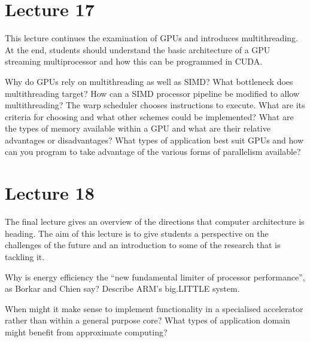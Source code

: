 \documentclass{supervision}
\begin{document}
\section*{Lecture 17}

This lecture continues the examination of GPUs and introduces multithreading. At the end, students should understand the basic architecture of a GPU streaming multiprocessor and how this can be programmed in CUDA.

\begin{questions}
    \question
    Why do GPUs rely on multithreading as well as SIMD? What bottleneck does multithreading target?
    \question
    How can a SIMD processor pipeline be modified to allow multithreading?
    \question
    The warp scheduler chooses instructions to execute. What are its criteria for choosing and what other schemes could be implemented?
    \question
    What are the types of memory available within a GPU and what are their relative advantages or disadvantages?
    \question
    What types of application best suit GPUs and how can you program to take advantage of the various forms of parallelism available?
\end{questions}

\section*{Lecture 18}

The final lecture gives an overview of the directions that computer architecture is heading. The aim of this lecture is to give students a perspective on the challenges of the future and an introduction to some of the research that is tackling it.

\begin{questions}
    \question
    Why is energy efficiency the “new fundamental limiter of processor performance”, as Borkar and Chien say?
    \question
    Describe ARM’s big.LITTLE system.
    \question
    When might it make sense to implement functionality in a specialised accelerator rather than within a general purpose core?
    \question
    What types of application domain might benefit from approximate computing?

\end{questions}
\end{document}
